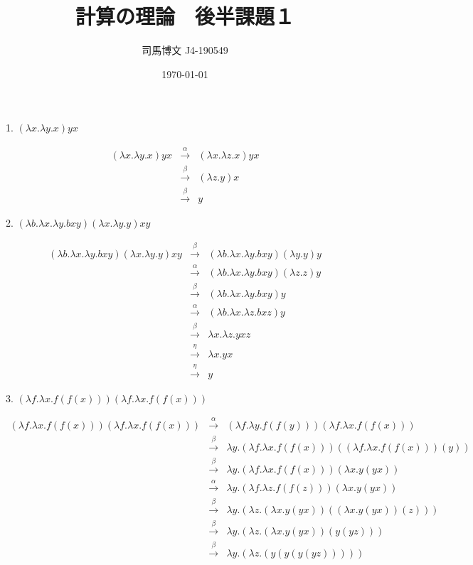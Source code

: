 \documentclass[uplatex, dvipdfmx]{jsarticle}
\title{計算の理論　後半課題１}
\author{司馬博文 J4-190549}
\date{\today}
\begin{document}
\maketitle

1. $(\lambda x.\lambda y.x)yx$

    \begin{eqnarray*}
        (\lambda x.\lambda y.x)yx &\xrightarrow{\alpha}& (\lambda x.\lambda z.x)yx \\
        &\xrightarrow{\beta}& (\lambda z.y)x \\
        &\xrightarrow{\beta}& y
    \end{eqnarray*}

    2. $(\lambda b.\lambda x.\lambda y.bxy)(\lambda x.\lambda y.y)xy$

    \begin{eqnarray*}
        (\lambda b.\lambda x.\lambda y.bxy)(\lambda x.\lambda y.y)xy &\xrightarrow{\beta}& (\lambda b.\lambda x.\lambda y.bxy)(\lambda y.y)y \\
        &\xrightarrow{\alpha}& (\lambda b.\lambda x.\lambda y.bxy)(\lambda z.z)y \\
        &\xrightarrow{\beta}& (\lambda b.\lambda x.\lambda y.bxy)y \\
        &\xrightarrow{\alpha}& (\lambda b.\lambda x.\lambda z.bxz)y \\
        &\xrightarrow{\beta}& \lambda x.\lambda z.yxz \\
        &\xrightarrow{\eta}& \lambda x.yx \\
        &\xrightarrow{\eta}& y
    \end{eqnarray*}

    3. $(\lambda f.\lambda x.f(f(x)))(\lambda f.\lambda x.f(f(x)))$

    \begin{eqnarray*}
        (\lambda f.\lambda x.f(f(x)))(\lambda f.\lambda x.f(f(x))) &\xrightarrow{\alpha}& (\lambda f.\lambda y.f(f(y)))(\lambda f.\lambda x.f(f(x))) \\
        &\xrightarrow{\beta}& \lambda y.(\lambda f.\lambda x.f(f(x)))((\lambda f.\lambda x.f(f(x)))(y)) \\
        &\xrightarrow{\beta}& \lambda y.(\lambda f.\lambda x.f(f(x)))(\lambda x.y(yx)) \\
        &\xrightarrow{\alpha}& \lambda y.(\lambda f.\lambda z.f(f(z)))(\lambda x.y(yx)) \\
        &\xrightarrow{\beta}& \lambda y.(\lambda z.(\lambda x.y(yx))((\lambda x.y(yx))(z))) \\
        &\xrightarrow{\beta}& \lambda y.(\lambda z.(\lambda x.y(yx))(y(yz))) \\
        &\xrightarrow{\beta}& \lambda y.(\lambda z.(y(y(y(yz)))))
    \end{eqnarray*}
\end{document}
